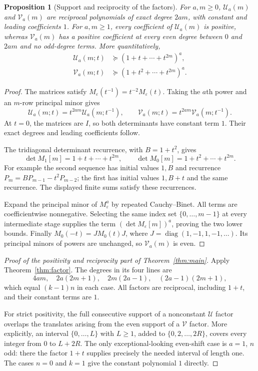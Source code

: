 \documentclass[11pt]{article}
\newtheorem{proposition}[theorem]{Proposition}
\theoremstyle{definition}
\theoremstyle{remark}
\newcommand{\diag}{\operatorname{diag}}
\newcommand{\U}{\mathcal U}
\newcommand{\V}{\mathcal V}
\newcommand{\coeffge}{\succeq}
\newcommand{\eps}{\varepsilon}
\theoremstyle{definition}
\theoremstyle{plain}
\numberwithin{equation}{section}
\begin{document}
\begin{proposition}[Support and reciprocity of the factors]
\label{prop:factor-positive}
For $a,m\ge0$, $\U_a(m)$ and $\V_a(m)$ are reciprocal polynomials of
exact degree $2am$, with constant and leading coefficients $1$.
For $a,m\ge1$, every coefficient of $\U_a(m)$ is positive, whereas
$\V_a(m)$ has a positive coefficient at every even degree between $0$ and
$2am$ and no odd-degree terms. More quantitatively,
\begin{align}
 \U_a(m;t)&\coeffge(1+t+\cdots+t^{2m})^a,\label{eq:U-lower}\\
 \V_a(m;t)&\coeffge(1+t^2+\cdots+t^{2m})^a.\label{eq:V-lower}
\end{align}
\end{proposition}
\begin{proof}
The matrices satisfy $M_\eps(t^{-1})=t^{-2}M_\eps(t)$.
Taking the $a$th power and an $m$-row principal minor gives
\[
 \U_a(m;t)=t^{2am}\U_a(m;t^{-1}),\qquad
 \V_a(m;t)=t^{2am}\V_a(m;t^{-1}).
\]
At $t=0$, the matrices are $I$, so both determinants have constant term
$1$. Their exact degrees and leading coefficients follow.

The tridiagonal determinant recurrence, with $B=1+t^2$, gives
\[
 \det M_1[m]=1+t+\cdots+t^{2m},\qquad
 \det M_0[m]=1+t^2+\cdots+t^{2m}.
\]
For example the second sequence has initial values $1,B$ and recurrence
$P_m=BP_{m-1}-t^2P_{m-2}$; the first has initial values $1,B+t$
and the same recurrence. The displayed finite sums satisfy these recurrences.

Expand the principal minor of $M_\eps^a$ by repeated Cauchy--Binet. All
terms are coefficientwise nonnegative. Selecting the same index set
$\{0,\ldots,m-1\}$ at every intermediate stage supplies the term
$(\det M_\eps[m])^a$, proving the two lower bounds.
Finally $M_0(-t)=J M_0(t)J$, where $J=\diag(1,-1,1,-1,\ldots)$.
Its principal minors of powers are unchanged, so $\V_a(m)$ is even.
\end{proof}

\begin{proof}[Proof of the positivity and reciprocity part of Theorem~\ref{thm:main}]
Apply Theorem~\ref{thm:factor}. The degrees in its four lines are
\[
 4am,\quad 2a(2m+1),\quad 2m(2a-1),\quad (2a-1)(2m+1),
\]
which equal $(k-1)n$ in each case. All factors are reciprocal, including
$1+t$, and their constant terms are $1$.

For strict positivity, the full consecutive support of a nonconstant
$\U$ factor overlaps the translates arising from the even support of a
$\V$ factor. More explicitly, an interval $\{0,\ldots,L\}$ with $L\ge1$,
added to $\{0,2,\ldots,2R\}$, covers every integer from $0$ to $L+2R$.
The only exceptional-looking even-shift case is $a=1$, $n$ odd: there the
factor $1+t$ supplies precisely the needed interval of length one.
The cases $n=0$ and $k=1$ give the constant polynomial $1$ directly.
\end{proof}
\end{document}

